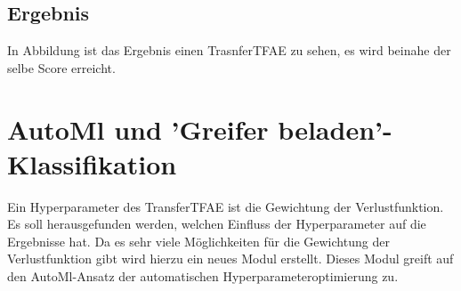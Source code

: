 		\subsection{Ergebnis}
		In Abbildung ist das Ergebnis einen TrasnferTFAE zu sehen, es wird beinahe der selbe Score erreicht.


	\section{AutoMl und 'Greifer beladen'-Klassifikation}
	\label{sec:todo}
	Ein Hyperparameter des TransferTFAE ist die Gewichtung der Verlustfunktion. Es soll herausgefunden werden, welchen Einfluss der Hyperparameter auf die Ergebnisse hat. Da es sehr viele Möglichkeiten für die Gewichtung der Verlustfunktion gibt wird hierzu ein neues Modul erstellt. Dieses Modul greift auf den AutoMl-Ansatz der automatischen Hyperparameteroptimierung zu.
